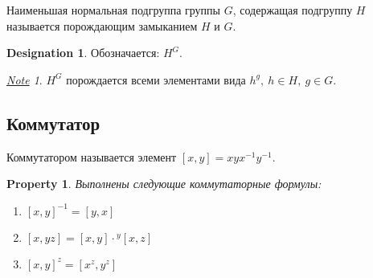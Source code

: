 \documentclass[11pt]{book}
\theoremstyle{definition}
\theoremstyle{plain}
\theoremstyle{plain}
\newtheorem*{prop}{Property}
\theoremstyle{definition}
\newtheorem*{name}{Designation}
\theoremstyle{remark}
\newtheorem*{note}{\underline{Note}}
\begin{document}
\begin{defn}
    Наименьшая нормальная подгруппа группы $ G$, содержащая подгруппу $ H$ называется {\sf порождающим замыканием}  $ H $ и $ G$.
    \begin{name}
	Обозначается: $ H^{G}$.
    \end{name}
    \begin{note}
	$ H^{G}$ порождается всеми элементами вида $ h^{g}, ~ h \in H, ~ g \in G$.
    \end{note}
\end{defn}
\subsection{Коммутатор}
\begin{defn}
    {\sf Коммутатором} называется элемент $ [x, y] = xy x^{-1} y ^{-1}$.
\end{defn}
\begin{prop}\label{pc}
    Выполнены следующие коммутаторные формулы:
    \begin{enumerate}[noitemsep]
	\item $ [x, y]^{-1} = [y,x]$
	\item \label{fc}$ [x, yz] = [x, y] \cdot {^{y}\![x , z]}$
	\item  $[x, y]^z = [x^z, y^z]$
    \end{enumerate}
\end{prop}
\end{document}
